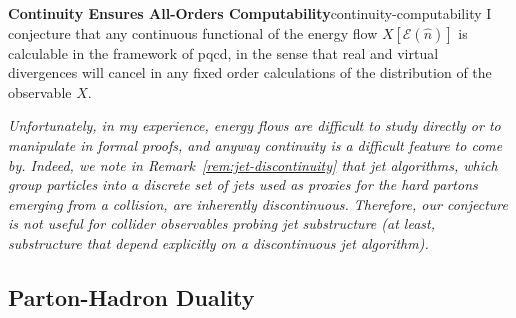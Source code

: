 \vspace{-10pt}
\begin{adjustwidth}{20pt}{20pt}
    \begin{conjecture}{{\bf Continuity Ensures All-Orders Computability}}{continuity-computability}
        {\rm
            I conjecture that any continuous functional of the energy flow \(X[\mathcal{E}(\hat{n})]\) is calculable in the framework of \gls{pqcd}, in the sense that real and virtual divergences will cancel in any fixed order calculations of the distribution of the observable \(X\).
        }
    \end{conjecture}
\textit{
    Unfortunately, in my experience, energy flows are difficult to study directly or to manipulate in formal proofs, and anyway continuity is a difficult feature to come by.
    Indeed, we note in Remark~\ref{rem:jet-discontinuity} that jet algorithms, which group particles into a discrete set of jets used as proxies for the hard partons emerging from a collision, are inherently discontinuous.
    Therefore, our conjecture is not useful for collider observables probing jet substructure (at least, substructure that depend explicitly on a discontinuous jet algorithm).
}
\end{adjustwidth}




\subsection{Parton-Hadron Duality}
\label{sec:phd}

